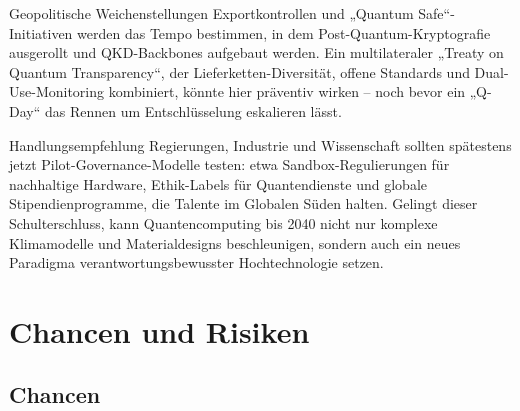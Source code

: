 Geopolitische Weichenstellungen
Exportkontrollen und „Quantum Safe“-Initiativen werden das Tempo bestimmen, in dem Post-Quantum-Kryptografie ausgerollt und QKD-Backbones aufgebaut werden. Ein multilateraler „Treaty on Quantum Transparency“, der Lieferketten-Diversität, offene Standards und Dual-Use-Monitoring kombiniert, könnte hier präventiv wirken – noch bevor ein „Q-Day“ das Rennen um Entschlüsselung eskalieren lässt.

Handlungsempfehlung
Regierungen, Industrie und Wissenschaft sollten spätestens jetzt Pilot-Governance-Modelle testen: etwa Sandbox-Regulierungen für nachhaltige Hardware, Ethik-Labels für Quantendienste und globale Stipendienprogramme, die Talente im Globalen Süden halten. Gelingt dieser Schulterschluss, kann Quantencomputing bis 2040 nicht nur komplexe Klimamodelle und Materialdesigns beschleunigen, sondern auch ein neues Paradigma verantwortungsbewusster Hochtechnologie setzen.


















\section{Chancen und Risiken}

\subsection{Chancen}

